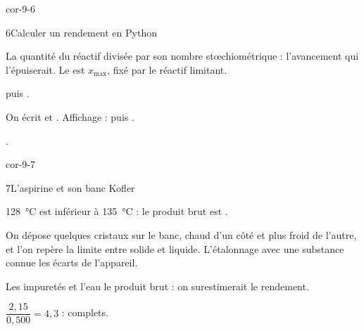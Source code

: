\begin{blocLivre}{cor-9-6}
\begin{corrige}{6}{Calculer un rendement en Python}
\begin{questions}
\item La quantité du réactif divisée par son nombre stœchiométrique : l'avancement qui l'épuiserait. Le  est
$x_\text{max}$, fixé par le réactif limitant.
\item {} puis .
\item On écrit  et
.\newline
Affichage :  puis .
\item {}.
\end{questions}
\end{corrige}
\end{blocLivre}
\begin{blocLivre}{cor-9-7}
\begin{corrige}{7}{L'aspirine et son banc Kofler}
\begin{questions}
\item \qty{128}{\degreeCelsius} est inférieur à \qty{135}{\degreeCelsius} : le produit brut est .
\item On dépose quelques cristaux sur le banc, chaud d'un côté et plus froid de l'autre, et l'on repère la limite entre
solide et liquide. L'étalonnage avec une substance connue  les écarts de l'appareil.
\item Les impuretés et l'eau  le produit brut : on surestimerait le rendement.
\item $\dfrac{2{,}15}{0{,}500}=4{,}3$ :  complets.
\end{questions}
\end{corrige}
\end{blocLivre}
